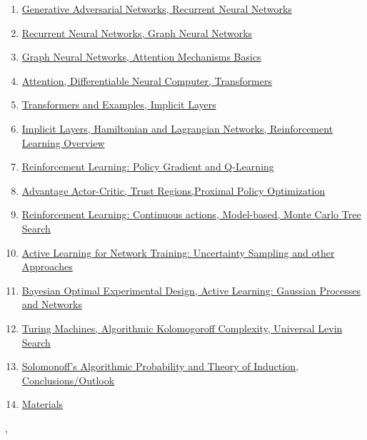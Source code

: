 \documentclass[11pt]{article}
\renewcommand{\today}{\shortmonthname[\the\month] \the \day,  \the\year}
\begin{document}
\begin{enumerate}
	\item \href{https://mp.weixin.qq.com/s/RbPXU8Es-ipy9bOt1zeKcA}{Generative Adversarial Networks, Recurrent Neural Networks}%
	\item \href{https://mp.weixin.qq.com/s/4VGsSCHsf2Jsp6WmaRivAw}{Recurrent Neural Networks, Graph Neural Networks}%
	\item \href{https://mp.weixin.qq.com/s/8kGlkNaP9rnTIcBE6d46aA}{Graph Neural Networks, Attention Mechanisms Basics}%
	\item \href{https://mp.weixin.qq.com/s/GvGFZBGskYBRd89KH1MvCg}{Attention, Differentiable Neural Computer, Transformers}%
	\item \href{https://mp.weixin.qq.com/s/jI3TAmtOXYaqy3U2nRN-gg}{Transformers and Examples, Implicit Layers}%
	\item \href{https://mp.weixin.qq.com/s/t0yu1kgJZplIHeoe_gzmeA}{Implicit Layers, Hamiltonian and Lagrangian Networks, Reinforcement Learning Overview}%
	\item \href{https://mp.weixin.qq.com/s/nnghVZXxebGAPPRU61wEXw}{Reinforcement Learning: Policy Gradient and Q-Learning}%
	\item \href{https://mp.weixin.qq.com/s/SK0vRxXBOLFTYe-75DL35g}{Advantage Actor-Critic, Trust Regions,Proximal Policy Optimization}%
	\item \href{https://mp.weixin.qq.com/s/XejVx34Xeu9MTbIENMuJJw}{Reinforcement Learning: Continuous actions, Model-based, Monte Carlo Tree Search}%
	\item \href{https://mp.weixin.qq.com/s/nG5CdFTxCK48HwxPLAKlUA}{Active Learning for Network Training: Uncertainty Sampling and other Approaches}%
	\item \href{https://mp.weixin.qq.com/s/jjAWohCS942dOftl4-RO5A}{Bayesian Optimal Experimental Design, Active Learning: Gaussian Processes and Networks}%
	\item \href{https://mp.weixin.qq.com/s/lBQL5RmAbNq2QuiHWl4YPA}{Turing Machines, Algorithmic Kolomogoroff Complexity, Universal Levin Search}%
	\item \href{https://mp.weixin.qq.com/s/aWXLGFTHQqYc0wGxARo2kA}{Solomonoff's Algorithmic Probability and Theory of Induction, Conclusions/Outlook}%
	\item \href{https://pan.baidu.com/s/1cEL4WbSzjutl7Sfgrg0bpw}{Materials}
\end{enumerate}


%
\begin{flushright}
	\tiny \today 
\end{flushright}
\end{document}

